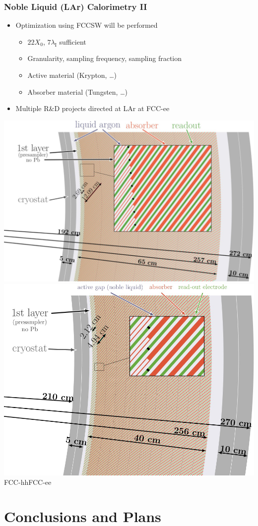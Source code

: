 \documentclass{beamer}
\begin{document}
\begin{frame}
  \frametitle{Noble Liquid (LAr) Calorimetry II}

  \begin{itemize}
    \item Optimization using FCCSW will be performed
          \begin{itemize}
            \item $22 X_0$, $7\lambda_\text{I}$ sufficient
            \item Granularity, sampling frequency, sampling fraction
            \item Active material (Krypton, \dots)
            \item Absorber material (Tungsten, \dots)
          \end{itemize}
    \item Multiple R\&D projects directed at LAr at FCC-ee
  \end{itemize}

  \includegraphics[align=c,width=0.47\linewidth]{figures/FCC_hh_LAr_diagram.png}%
  \hfill
  \includegraphics[align=c,width=0.47\linewidth]{figures/FCC_ee_LAr_diagram.png}\\[2ex]
  \hspace{6em}FCC-hh\hspace{11em}FCC-ee
\end{frame}


\section{Conclusions and Plans}
\end{document}
